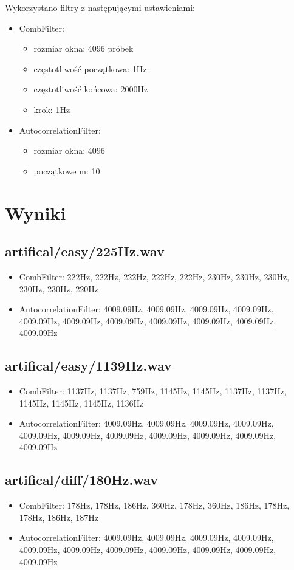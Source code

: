 \documentclass{classrep}
\begin{document}
Wykorzystano filtry z następującymi ustawieniami:
\begin{itemize}
 \item CombFilter:
 \begin{itemize}
  \item rozmiar okna: 4096 próbek
  \item częstotliwość początkowa: 1Hz
  \item częstotliwość końcowa: 2000Hz
  \item krok: 1Hz
 \end{itemize}
 \item AutocorrelationFilter:
 \begin{itemize}
  \item rozmiar okna: 4096
  \item początkowe m: 10
 \end{itemize}
\end{itemize}

\section{Wyniki}
\subsection{artifical/easy/225Hz.wav}
\begin{itemize}
 \item CombFilter: 222Hz, 222Hz, 222Hz, 222Hz, 222Hz, 230Hz, 230Hz, 230Hz, 230Hz, 230Hz, 220Hz
 \item AutocorrelationFilter: 4009.09Hz, 4009.09Hz, 4009.09Hz, 4009.09Hz, 4009.09Hz, 4009.09Hz, 4009.09Hz, 4009.09Hz, 4009.09Hz, 4009.09Hz, 4009.09Hz
\end{itemize}

\subsection{artifical/easy/1139Hz.wav}
\begin{itemize}
 \item CombFilter: 1137Hz, 1137Hz, 759Hz, 1145Hz, 1145Hz, 1137Hz, 1137Hz, 1145Hz, 1145Hz, 1145Hz, 1136Hz
 \item AutocorrelationFilter: 4009.09Hz, 4009.09Hz, 4009.09Hz, 4009.09Hz, 4009.09Hz, 4009.09Hz, 4009.09Hz, 4009.09Hz, 4009.09Hz, 4009.09Hz, 4009.09Hz
\end{itemize}

\subsection{artifical/diff/180Hz.wav}
\begin{itemize}
 \item CombFilter: 178Hz, 178Hz, 186Hz, 360Hz, 178Hz, 360Hz, 186Hz, 178Hz, 178Hz, 186Hz, 187Hz
 \item AutocorrelationFilter: 4009.09Hz, 4009.09Hz, 4009.09Hz, 4009.09Hz, 4009.09Hz, 4009.09Hz, 4009.09Hz, 4009.09Hz, 4009.09Hz, 4009.09Hz, 4009.09Hz
\end{itemize}
\end{document}
